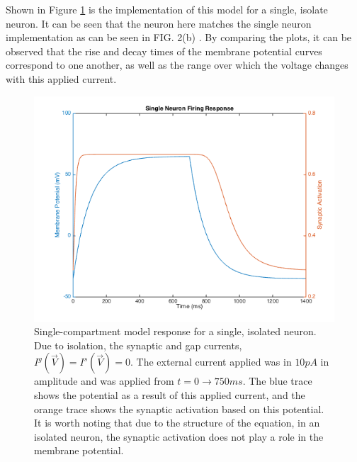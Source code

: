 \documentclass[11pt]{article} %
\begin{document}
Shown in Figure \ref{fig:f1} is the implementation of this model for a single, isolate neuron. It can be seen that the neuron here matches the single neuron implementation as can be seen in FIG. 2(b) \cite{Kunert2014}. By comparing the plots, it can be observed that the rise and decay times of the membrane potential curves correspond to one another, as well as the range over which the voltage changes with this applied current.
\begin{figure}[h!]
\begin{center}
\includegraphics[scale=0.4]{motn_fig1.png} \caption[h1]{Single-compartment model response for a single, isolated neuron. Due to isolation, the synaptic and gap currents, $I^g(\vec{V}) = I^s(\vec{V}) = 0$. The external current applied was in $10 pA$ in amplitude and was applied from $t=0\to750 ms$. The blue trace shows the potential as a result of this applied current, and the orange trace shows the synaptic activation based on this potential. It is worth noting that due to the structure of the equation, in an isolated neuron, the synaptic activation does not play a role in the membrane potential.} \label{fig:f1} \end{center}
\end{figure}  

\end{document}
